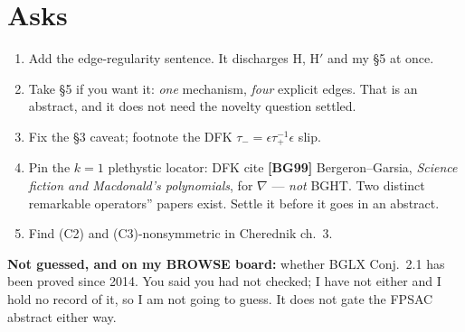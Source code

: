 \documentclass[11pt]{article}
\begin{document}
\section{Asks}
\begin{enumerate}\itemsep2pt
\item Add the edge-regularity sentence. It discharges H, H$'$ and my \S5 at once.
\item Take \S5 if you want it: \emph{one} mechanism, \emph{four} explicit edges. That is an
abstract, and it does not need the novelty question settled.
\item Fix the \S3 caveat; footnote the DFK $\tau_-=\epsilon\tau_+^{-1}\epsilon$ slip.
\item Pin the $k=1$ plethystic locator: DFK cite \textbf{[BG99]} Bergeron--Garsia,
\emph{Science fiction and Macdonald's polynomials}, for $\nabla$ --- \emph{not} BGHT. Two distinct
remarkable operators'' papers exist. Settle it before it goes in an abstract.
\item Find (C2) and (C3)-nonsymmetric in Cherednik ch.~3.
\end{enumerate}
\textbf{Not guessed, and on my BROWSE board:} whether BGLX Conj.~2.1 has been proved since 2014.
You said you had not checked; I have not either and I hold no record of it, so I am not going to
guess. It does not gate the FPSAC abstract either way.
\end{document}
